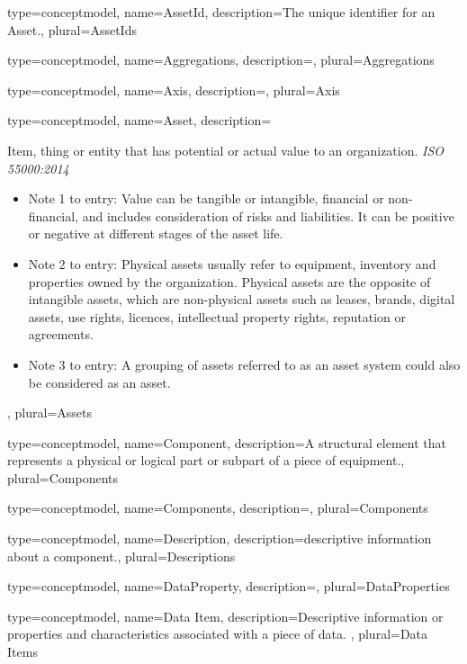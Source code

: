 {
	type={conceptmodel},
    name={AssetId},
	description={The unique identifier for an Asset.},
	plural={AssetIds}
}

{
	type={conceptmodel},
    name={Aggregations},
	description={},
	plural={Aggregations}
}

{
	type={conceptmodel},
    name={Axis},
	description={},
	plural={Axis}
}

{
	type={conceptmodel},
    name={Asset},
	description={Item, thing or entity that has potential or actual value to an organization. \textit{ISO 55000:2014}
\begin{itemize}
    \item Note 1 to entry: Value can be tangible or intangible, financial or non-financial, and includes consideration of risks and liabilities. It can be positive or negative at different stages of the asset life.
    \item Note 2 to entry: Physical assets usually refer to equipment, inventory and properties owned by the organization. Physical assets are the opposite of intangible assets, which are non-physical assets such as leases, brands, digital assets, use rights, licences, intellectual property rights, reputation or agreements.
    \item Note 3 to entry: A grouping of assets referred to as an asset system could also be considered as an asset.
\end{itemize}
},
	plural={Assets}
}

{
	type={conceptmodel},
    name={Component},
	description={A \gls{structural element} that represents a physical or logical part or subpart of a piece of equipment.},
	plural={Components}
}

{
	type={conceptmodel},
    name={Components},
	description={},
	plural={Components}
}

{
	type={conceptmodel},
    name={Description},
	description={descriptive information about a component.},
	plural={Descriptions}
}

{
	type={conceptmodel},
    name={DataProperty},
	description={},
	plural={DataProperties}
}

{
	type={conceptmodel},
    name={Data Item},
	description={Descriptive information or properties and characteristics associated with a piece of data.
},
	plural={Data Items}
}

